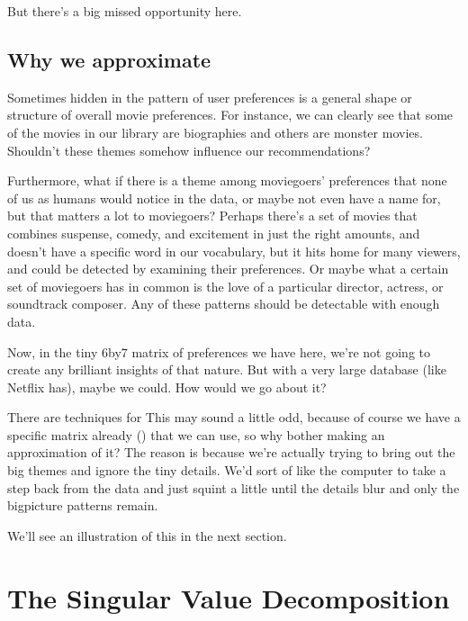 \documentclass[letterpaper,10pt,english]{jupyterBook}
\begin{document}
\sphinxAtStartPar
But there’s a big missed opportunity here.


\subsection{Why we approximate}
\label{\detokenize{chapter-16-matrices:why-we-approximate}}
\sphinxAtStartPar
Sometimes hidden in the pattern of user preferences is a general shape or structure of overall movie preferences.  For instance, we can clearly see that some of the movies in our library are biographies and others are monster movies.  Shouldn’t these themes somehow influence our recommendations?

\sphinxAtStartPar
Furthermore, what if there is a theme among moviegoers’ preferences that none of us as humans would notice in the data, or maybe not even have a name for, but that matters a lot to moviegoers?  Perhaps there’s a set of movies that combines suspense, comedy, and excitement in just the right amounts, and doesn’t have a specific word in our vocabulary, but it hits home for many viewers, and could be detected by examining their preferences.  Or maybe what a certain set of moviegoers has in common is the love of a particular director, actress, or soundtrack composer.  Any of these patterns should be detectable with enough data.

\sphinxAtStartPar
Now, in the tiny 6\sphinxhyphen{}by\sphinxhyphen{}7 matrix of preferences we have here, we’re not going to create any brilliant insights of that nature.  But with a very large database (like Netflix has), maybe we could.  How would we go about it?

\sphinxAtStartPar
There are techniques for   This may sound a little odd, because of course we have a specific matrix already () that we can use, so why bother making an approximation of it?  The reason is because we’re actually trying to bring out the big themes and ignore the tiny details.  We’d sort of like the computer to take a step back from the data and just squint a little until the details blur and only the big\sphinxhyphen{}picture patterns remain.

\sphinxAtStartPar
We’ll see an illustration of this in the next section.


\section{The Singular Value Decomposition}
\label{\detokenize{chapter-16-matrices:the-singular-value-decomposition}}
\end{document}
